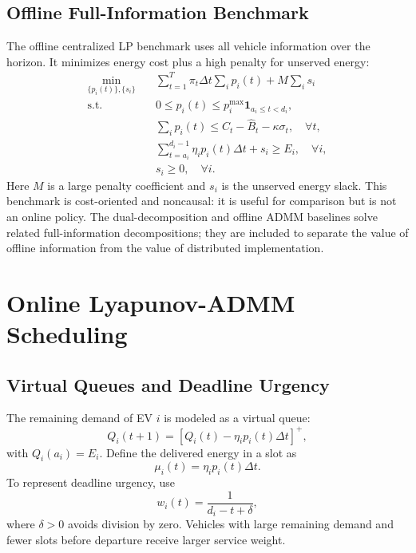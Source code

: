\documentclass[journal]{IEEEtran}
\begin{document}
\subsection{Offline Full-Information Benchmark}
The offline centralized LP benchmark uses all vehicle information over the horizon. It minimizes energy cost plus a high penalty for unserved energy:
\begin{align}
\min_{\{p_i(t)\},\{s_i\}} \quad
& \sum_{t=1}^{T}\pi_t\Delta t\sum_i p_i(t) + M\sum_i s_i \label{eq:offline_lp_obj}\\
\text{s.t.}\quad
& 0\le p_i(t)\le p_i^{\max}\mathbf{1}_{a_i\le t<d_i}, \label{eq:offline_box}\\
& \sum_i p_i(t)\le C_t-\hat B_t-\kappa\sigma_t,\quad \forall t, \label{eq:offline_cap}\\
& \sum_{t=a_i}^{d_i-1}\eta_i p_i(t)\Delta t+s_i\ge E_i,\quad \forall i, \label{eq:offline_energy}\\
& s_i\ge0,\quad \forall i. \label{eq:offline_slack}
\end{align}
Here $M$ is a large penalty coefficient and $s_i$ is the unserved energy slack. This benchmark is cost-oriented and noncausal: it is useful for comparison but is not an online policy. The dual-decomposition and offline ADMM baselines solve related full-information decompositions; they are included to separate the value of offline information from the value of distributed implementation.

\section{Online Lyapunov-ADMM Scheduling}
\subsection{Virtual Queues and Deadline Urgency}
The remaining demand of EV $i$ is modeled as a virtual queue:
\begin{equation}
Q_i(t+1)=\left[Q_i(t)-\eta_i p_i(t)\Delta t\right]^+ ,
\label{eq:queue_update}
\end{equation}
with $Q_i(a_i)=E_i$. Define the delivered energy in a slot as
\begin{equation}
\mu_i(t)=\eta_i p_i(t)\Delta t .
\label{eq:service}
\end{equation}
To represent deadline urgency, use
\begin{equation}
w_i(t)=\frac{1}{d_i-t+\delta},
\label{eq:urgency}
\end{equation}
where $\delta>0$ avoids division by zero. Vehicles with large remaining demand and fewer slots before departure receive larger service weight.
\end{document}
